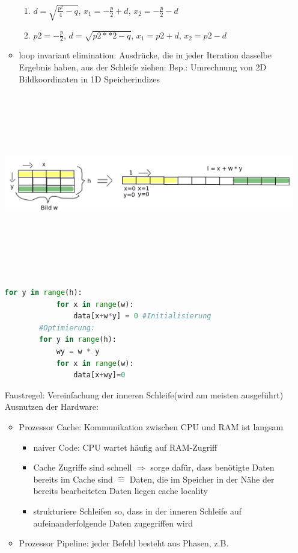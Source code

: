 \documentclass[11pt, fleqn]{scrreprt}
\begin{document}
\begin{itemize}
\begin{itemize}
\begin{enumerate}
				\item $d = \sqrt{\frac{p^2}{4} - q}$,\hspace*{2mm} $x_1 = -\frac{p}{2} + d $,\hspace*{2mm} $x_2 =- \frac{p}{2} - d$
				\item $p2 = -\frac{p}{2}$, \hspace*{2mm}$d= \sqrt{p2**2-q}$,\hspace*{2mm} $x_1 = p2 + d$, \hspace*{2mm}$x_2 = p2 - d$
			\end{enumerate}
			\vspace*{2mm}
			\item \glqq loop invariant elimination\grqq : Ausdrücke, die in jeder Iteration dasselbe Ergebnis haben, aus der Schleife ziehen: Bsp.: Umrechnung von 2D Bildkoordinaten in 1D Speicherindizes
		\end{itemize}
		\includegraphics[width=15cm,height=8cm,keepaspectratio]{./Pictures/2D1D.png}
		\begin{lstlisting}[language=Python]
		for y in range(h):
			for x in range(w):
				data[x+w*y] = 0	#Initialisierung
		#Optimierung:
		for y in range(h):
			wy = w * y
			for x in range(w):
				data[x+wy]=0
		\end{lstlisting}
		Faustregel: \glqq Vereinfachung der inneren Schleife\grqq  (wird am meisten ausgeführt)\\
		Ausnutzen der Hardware:
		\begin{itemize}
			\item Prozessor Cache: Kommunikation zwischen CPU und RAM ist langsam
			\begin{itemize}[label={$\Rightarrow$}]
				\item naiver Code: CPU wartet häufig auf RAM-Zugriff
				\item Cache Zugriffe sind schnell  $\Rightarrow$ sorge dafür, dass benötigte Daten bereits im Cache sind $\widehat{=}$ Daten, die im Speicher in der Nähe der bereits bearbeiteten Daten liegen \glqq cache locality\grqq
				\item strukturiere Schleifen so, dass in der inneren Schleife auf aufeinanderfolgende Daten zugegriffen wird
			\end{itemize}
			\item Prozessor Pipeline: jeder Befehl besteht aus Phasen, z.B.	
		\end{itemize}
	\end{itemize}
\end{document}
